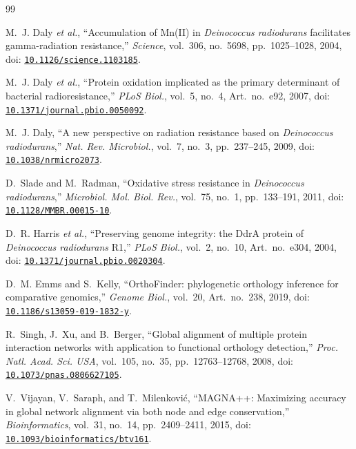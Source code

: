 \documentclass[conference]{IEEEtran}
\begin{document}
\begin{thebibliography}{99}

M.~J. Daly \emph{et al.}, ``Accumulation of Mn(II) in \emph{Deinococcus radiodurans} facilitates
gamma-radiation resistance,'' \emph{Science}, vol.~306, no.~5698, pp.~1025--1028, 2004,
doi: \href{https://doi.org/10.1126/science.1103185}{\nolinkurl{10.1126/science.1103185}}.

M.~J. Daly \emph{et al.}, ``Protein oxidation implicated as the primary determinant of bacterial
radioresistance,'' \emph{PLoS Biol.}, vol.~5, no.~4, Art.~no.~e92, 2007,
doi: \href{https://doi.org/10.1371/journal.pbio.0050092}{\nolinkurl{10.1371/journal.pbio.0050092}}.

M.~J. Daly, ``A new perspective on radiation resistance based on \emph{Deinococcus
radiodurans},'' \emph{Nat. Rev. Microbiol.}, vol.~7, no.~3, pp.~237--245, 2009,
doi: \href{https://doi.org/10.1038/nrmicro2073}{\nolinkurl{10.1038/nrmicro2073}}.

D.~Slade and M.~Radman, ``Oxidative stress resistance in \emph{Deinococcus radiodurans},''
\emph{Microbiol. Mol. Biol. Rev.}, vol.~75, no.~1, pp.~133--191, 2011,
doi: \href{https://doi.org/10.1128/MMBR.00015-10}{\nolinkurl{10.1128/MMBR.00015-10}}.

D.~R. Harris \emph{et al.}, ``Preserving genome integrity: the DdrA protein of \emph{Deinococcus
radiodurans} R1,'' \emph{PLoS Biol.}, vol.~2, no.~10, Art.~no.~e304, 2004,
doi: \href{https://doi.org/10.1371/journal.pbio.0020304}{\nolinkurl{10.1371/journal.pbio.0020304}}.

D.~M. Emms and S.~Kelly, ``OrthoFinder: phylogenetic orthology inference for comparative
genomics,'' \emph{Genome Biol.}, vol.~20, Art.~no.~238, 2019,
doi: \href{https://doi.org/10.1186/s13059-019-1832-y}{\nolinkurl{10.1186/s13059-019-1832-y}}.

R.~Singh, J.~Xu, and B.~Berger, ``Global alignment of multiple protein interaction networks with
application to functional orthology detection,'' \emph{Proc. Natl. Acad. Sci. USA}, vol.~105,
no.~35, pp.~12763--12768, 2008,
doi: \href{https://doi.org/10.1073/pnas.0806627105}{\nolinkurl{10.1073/pnas.0806627105}}.

V.~Vijayan, V.~Saraph, and T.~Milenkovi\'{c}, ``MAGNA++: Maximizing accuracy in global network
alignment via both node and edge conservation,'' \emph{Bioinformatics}, vol.~31, no.~14,
pp.~2409--2411, 2015,
doi: \href{https://doi.org/10.1093/bioinformatics/btv161}{\nolinkurl{10.1093/bioinformatics/btv161}}.


\end{thebibliography}
\end{document}
